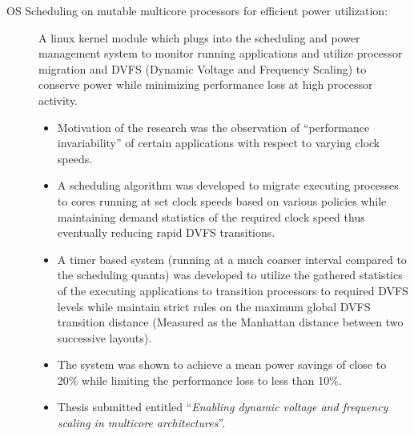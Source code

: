 \begin{description}
\item[OS Scheduling on mutable multicore processors for efficient power utilization:] A linux kernel module which plugs into the scheduling and power management system to monitor running applications and utilize processor migration and DVFS (Dynamic Voltage and Frequency Scaling) to conserve power while minimizing performance loss at high processor activity.
\begin{itemize}
\item Motivation of the research was the observation of ``performance invariability'' of certain applications with respect to varying clock speeds.
\item A scheduling algorithm was developed to migrate executing processes to cores running at set clock speeds based on various policies while maintaining demand statistics of the required clock speed thus eventually reducing rapid DVFS transitions.
\item A timer based system (running at a much coarser interval compared to the scheduling quanta) was developed to utilize the gathered statistics of the executing applications to transition processors to required DVFS levels while maintain strict rules on the maximum global DVFS transition distance (Measured as the Manhattan distance between two successive layouts).
\item The system was shown to achieve a mean power savings of close to 20\% while limiting the performance loss to less than 10\%.
\item Thesis submitted entitled ``\textit{Enabling dynamic voltage and frequency scaling in multicore architectures}''.
\end{itemize}




\end{description}

